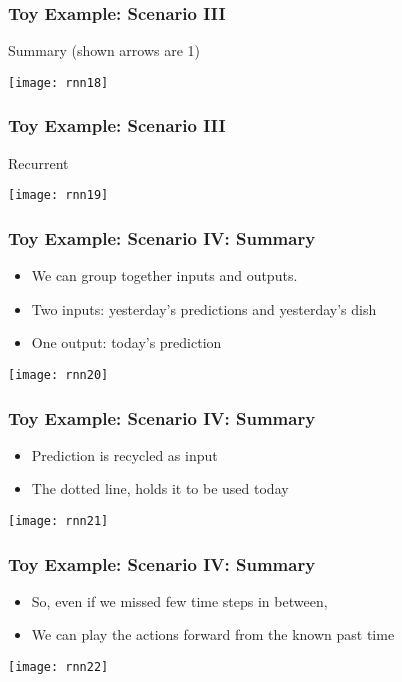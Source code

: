 \begin{frame}[fragile] \frametitle{Toy Example: Scenario III}
Summary (shown arrows are 1)
\begin{center}
\texttt{[image: rnn18]}
\end{center}
\end{frame}

\begin{frame}[fragile] \frametitle{Toy Example: Scenario III}
Recurrent
\begin{center}
\texttt{[image: rnn19]}
\end{center}
\end{frame}

\begin{frame}[fragile] \frametitle{Toy Example: Scenario IV: Summary}
\begin{itemize}
\item We can group together inputs and outputs.
\item Two inputs: yesterday's predictions and yesterday's dish
\item One output: today's prediction
\end{itemize}
\begin{center}
\texttt{[image: rnn20]}
\end{center}
\end{frame}

\begin{frame}[fragile] \frametitle{Toy Example: Scenario IV: Summary}
\begin{itemize}
\item Prediction is recycled as input
\item The dotted line, holds it to be used today
\end{itemize}
\begin{center}
\texttt{[image: rnn21]}
\end{center}
\end{frame}

\begin{frame}[fragile] \frametitle{Toy Example: Scenario IV: Summary}
\begin{itemize}
\item So, even if we missed few time steps in between, 
\item We can play the actions forward from the known past time
\end{itemize}
\begin{center}
\texttt{[image: rnn22]}
\end{center}
\end{frame}

